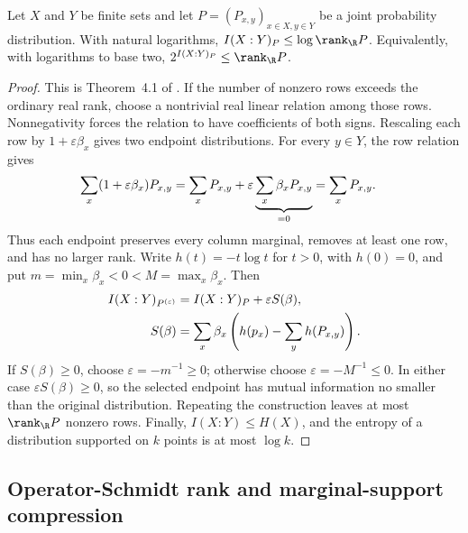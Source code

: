 \begin{theorem}
    \label{thm:classical_mutual_information_le_log_rank}
    \leanok
    Let $X$ and $Y$ be finite sets and let $P=(P_{x,y})_{x\in X,y\in Y}$
    be a joint probability distribution. With natural logarithms,
    $I(X:Y)_P\leq\log\rank_{\R}P$. Equivalently, with logarithms to base two,
    $2^{I(X:Y)_P}\leq\rank_{\R}P$.
\end{theorem}
\begin{proof}\leanok
    This is Theorem~4.1 of \cite{Riazanov2017PSDRank}. If the number of
    nonzero rows exceeds the ordinary real rank, choose a nontrivial real
    linear relation among those rows. Nonnegativity forces the relation to
    have coefficients of both signs. Rescaling each row by
    $1+\varepsilon\beta_x$ gives two endpoint distributions. For every
    $y\in Y$, the row relation gives
    \begin{align}
        \sum_x(1+\varepsilon\beta_x)P_{x,y}
         & =\sum_xP_{x,y}
        +\varepsilon\underbrace{\sum_x\beta_xP_{x,y}}_{=0}
        =\sum_xP_{x,y}.
        \notag
    \end{align}
    Thus each endpoint preserves every column marginal, removes at least one
    row, and has no larger rank.
    Write $h(t)=-t\log t$ for $t>0$, with $h(0)=0$, and put
    $m=\min_x\beta_x<0<M=\max_x\beta_x$. Then
    \begin{align}
        I(X:Y)_{P^{(\varepsilon)}}
         & =I(X:Y)_P+\varepsilon S(\beta),
        \notag                                                  \\
        S(\beta)
         & =\sum_x\beta_x\left(h(p_x)-\sum_y h(P_{x,y})\right).
        \notag
    \end{align}
    If $S(\beta)\geq0$, choose $\varepsilon=-m^{-1}\geq0$; otherwise choose
    $\varepsilon=-M^{-1}\leq0$. In either case
    $\varepsilon S(\beta)\geq0$, so the selected endpoint has mutual
    information no smaller than the original distribution.
    Repeating the construction leaves at most
    $\rank_{\R}P$ nonzero rows. Finally,
    $I(X:Y)\leq H(X)$, and the entropy of a distribution supported on $k$
    points is at most $\log k$.
\end{proof}
\subsection{Operator-Schmidt rank and marginal-support compression}


